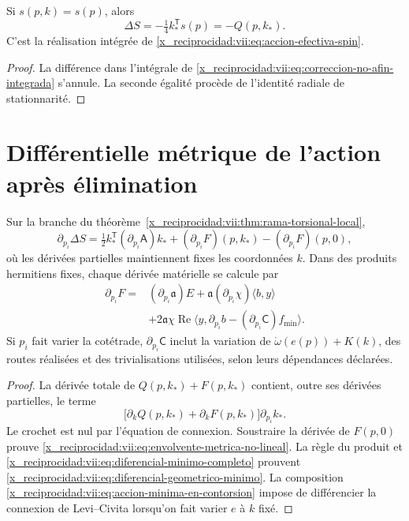 \begin{corollary}
\label{x_reciprocidad:vii:cor:recuperacion-eliminacion-afin}
Si \(s(p,k)=s(p)\), alors
\[
 \Delta S=-\tfrac14 k_*^{\mathsf T}s(p)=-Q(p,k_*).
\]
C'est la réalisation intégrée de \eqref{x_reciprocidad:vii:eq:accion-efectiva-spin}.
\end{corollary}
\begin{proof}
La différence dans l'intégrale de
\eqref{x_reciprocidad:vii:eq:correccion-no-afin-integrada} s'annule. La seconde
égalité procède de l'identité radiale de stationnarité.
\end{proof}

\section{Différentielle métrique de l'action après élimination}
\label{x_reciprocidad:vii:subsec:diferencial-metrico-no-lineal}

\begin{theorem}
\label{x_reciprocidad:vii:thm:envolvente-metrica}
Sur la branche du théorème~\ref{x_reciprocidad:vii:thm:rama-torsional-local},
\begin{equation}
 \partial_{p_i}\Delta S
 =\tfrac12 k_*^{\mathsf T}(\partial_{p_i}\mathsf A)k_*
  +(\partial_{p_i}F)(p,k_*)-(\partial_{p_i}F)(p,0),
 \label{x_reciprocidad:vii:eq:envolvente-metrica-no-lineal}
\end{equation}
où les dérivées partielles maintiennent fixes les coordonnées \(k\).
Dans des produits hermitiens fixes, chaque dérivée matérielle se calcule par
\begin{equation}
 \begin{split}
 \partial_{p_i}F={}&(\partial_{p_i}\mathfrak a)E
       +\mathfrak a(\partial_{p_i}\chi)\langle b,y\rangle\\
   &+2\mathfrak a\chi\operatorname{Re}
       \langle y,\partial_{p_i}b
                    -(\partial_{p_i}\mathsf C)f_{\min}\rangle.
 \end{split}
 \label{x_reciprocidad:vii:eq:diferencial-geometrico-minimo}
\end{equation}
Si \(p_i\) fait varier la cotétrade, \(\partial_{p_i}\mathsf C\) inclut la variation de \(\mathring\omega(e(p))+K(k)\), des routes réalisées et des trivialisations utilisées, selon leurs dépendances déclarées.
\end{theorem}

\begin{proof}
La dérivée totale de \(Q(p,k_*)+F(p,k_*)\) contient, outre
ses dérivées partielles, le terme
\[
 \bigl[\partial_kQ(p,k_*)+\partial_kF(p,k_*)\bigr]
                      \partial_{p_i}k_*.
\]
Le crochet est nul par l'équation de connexion. Soustraire la dérivée
de \(F(p,0)\) prouve
\eqref{x_reciprocidad:vii:eq:envolvente-metrica-no-lineal}.
La règle du produit et
\eqref{x_reciprocidad:vii:eq:diferencial-minimo-completo} prouvent
\eqref{x_reciprocidad:vii:eq:diferencial-geometrico-minimo}. La composition
\eqref{x_reciprocidad:vii:eq:accion-minima-en-contorsion} impose de différencier
la connexion de Levi--Civita lorsqu'on fait varier \(e\) à \(k\) fixé.
\end{proof}

